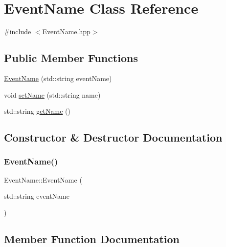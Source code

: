 \hypertarget{class_event_name}{}\section{Event\+Name Class Reference}
\label{class_event_name}


{\ttfamily \#include $<$Event\+Name.\+hpp$>$}

\subsection*{Public Member Functions}
\begin{DoxyCompactItemize}
\item 
\mbox{\hyperlink{class_event_name_a4e06946f2076c5edf7b909971c1a88b8}{Event\+Name}} (std\+::string event\+Name)
\item 
void \mbox{\hyperlink{class_event_name_a56c6c083913f99731f27a2becfd43672}{set\+Name}} (std\+::string name)
\item 
std\+::string \mbox{\hyperlink{class_event_name_a6ffddc64722014b6d4fdc9d0b5c4c0f2}{get\+Name}} ()
\end{DoxyCompactItemize}


\subsection{Constructor \& Destructor Documentation}
\mbox{\label{class_event_name_a4e06946f2076c5edf7b909971c1a88b8}} 
\subsubsection{\texorpdfstring{EventName()}{EventName()}}
{\footnotesize\ttfamily Event\+Name\+::\+Event\+Name (\begin{DoxyParamCaption}\item[{std\+::string}]{event\+Name }\end{DoxyParamCaption})}



\subsection{Member Function Documentation}
\mbox{\label{class_event_name_a6ffddc64722014b6d4fdc9d0b5c4c0f2}} 
